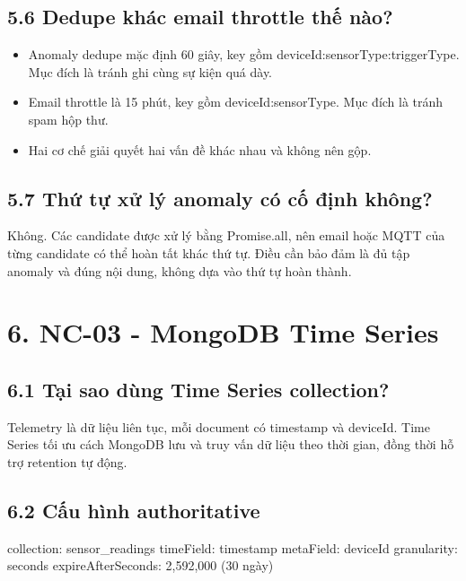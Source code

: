 \documentclass[11pt,oneside,openany]{book}
\renewcommand{\texttt}[1]{{\ttfamily\small #1}}
\newenvironment{Shaded}{\begin{snugshade}}{\end{snugshade}}
\newcommand{\NormalTok}[1]{\textcolor[rgb]{0.81,0.81,0.76}{#1}}
\renewenvironment{Shaded}{%
  \def\FrameCommand{\fboxsep=8pt\colorbox{shadecolor}}%
  \MakeFramed{\advance\hsize-\width\FrameRestore}%
}{\endMakeFramed}
\providecommand{\tightlist}{\setlength{\itemsep}{1pt}\setlength{\parskip}{0pt}}
\begin{document}
\subsection{5.6 Dedupe khác email throttle thế
nào?}\label{56-dedupe-khuxe1c-email-throttle-thux1ebf-nuxe0o}

\begin{itemize}
\tightlist
\item
  Anomaly dedupe mặc định 60 giây, key gồm
  \texttt{deviceId:sensorType:triggerType}. Mục đích là tránh ghi cùng
  sự kiện quá dày.
\item
  Email throttle là 15 phút, key gồm \texttt{deviceId:sensorType}. Mục
  đích là tránh spam hộp thư.
\item
  Hai cơ chế giải quyết hai vấn đề khác nhau và không nên gộp.
\end{itemize}

\subsection{5.7 Thứ tự xử lý anomaly có cố định
không?}\label{57-thux1ee9-tux1ef1-xux1eed-luxfd-anomaly-cuxf3-cux1ed1-ux111ux1ecbnh-khuxf4ng}

Không. Các candidate được xử lý bằng \texttt{Promise.all}, nên email
hoặc MQTT của từng candidate có thể hoàn tất khác thứ tự. Điều cần bảo
đảm là đủ tập anomaly và đúng nội dung, không dựa vào thứ tự hoàn thành.

\section{6. NC-03 - MongoDB Time
Series}\label{6-nc-03---mongodb-time-series}

\subsection{6.1 Tại sao dùng Time Series
collection?}\label{61-tux1ea1i-sao-duxf9ng-time-series-collection}

Telemetry là dữ liệu liên tục, mỗi document có timestamp và deviceId.
Time Series tối ưu cách MongoDB lưu và truy vấn dữ liệu theo thời gian,
đồng thời hỗ trợ retention tự động.

\subsection{6.2 Cấu hình
authoritative}\label{62-cux1ea5u-huxecnh-authoritative}

\begin{Shaded}
\begin{Highlighting}[]
\NormalTok{collection: sensor\_readings}
\NormalTok{timeField: timestamp}
\NormalTok{metaField: deviceId}
\NormalTok{granularity: seconds}
\NormalTok{expireAfterSeconds: 2,592,000 (30 ngày)}
\end{Highlighting}
\end{Shaded}
\end{document}
